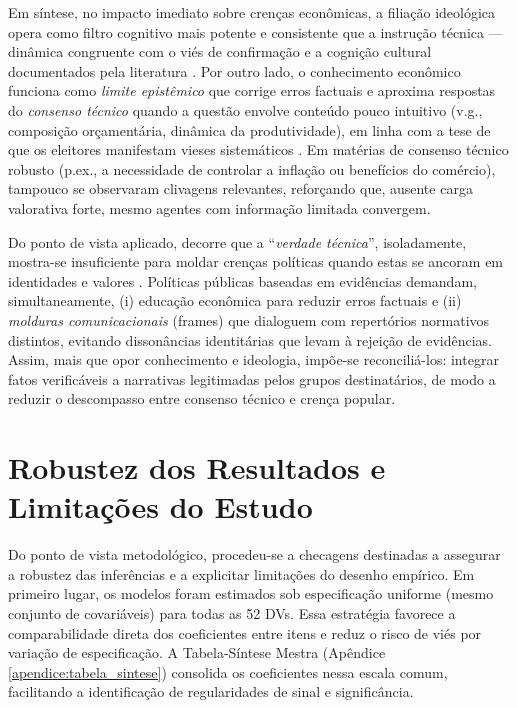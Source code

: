 Em síntese, no impacto imediato sobre crenças econômicas, a filiação ideológica opera como filtro cognitivo mais potente e consistente que a instrução técnica --- dinâmica congruente com o viés de confirmação e a cognição cultural documentados pela literatura \cite{kahneman2011thinking, kahan2012polarization}. Por outro lado, o conhecimento econômico funciona como \textit{limite epistêmico} que corrige erros factuais e aproxima respostas do \textit{consenso técnico} quando a questão envolve conteúdo pouco intuitivo (v.g., composição orçamentária, dinâmica da produtividade), em linha com a tese de que os eleitores manifestam vieses sistemáticos \cite{The_Myth_of_the_Rational_Voter}. Em matérias de consenso técnico robusto (p.ex., a necessidade de controlar a inflação ou benefícios do comércio), tampouco se observaram clivagens relevantes, reforçando que, ausente carga valorativa forte, mesmo agentes com informação limitada convergem.

Do ponto de vista aplicado, decorre que a ``\textit{verdade técnica}'', isoladamente, mostra-se insuficiente para moldar crenças políticas quando estas se ancoram em identidades e valores \cite{westen2007political}. Políticas públicas baseadas em evidências demandam, simultaneamente, (i) educação econômica para reduzir erros factuais e (ii) \textit{molduras comunicacionais} (frames) que dialoguem com repertórios normativos distintos, evitando dissonâncias identitárias que levam à rejeição de evidências. Assim, mais que opor conhecimento e ideologia, impõe-se reconciliá-los: integrar fatos verificáveis a narrativas legitimadas pelos grupos destinatários, de modo a reduzir o descompasso entre consenso técnico e crença popular.

\section{Robustez dos Resultados e Limitações do Estudo}
\label{sec:limitacao_robustez}
Do ponto de vista metodológico, procedeu-se a checagens destinadas a assegurar a robustez das inferências e a explicitar limitações do desenho empírico. Em primeiro lugar, os modelos foram estimados sob especificação uniforme (mesmo conjunto de covariáveis) para todas as 52 DVs. Essa estratégia favorece a comparabilidade direta dos coeficientes entre itens e reduz o risco de viés por variação de especificação. A Tabela-Síntese Mestra (Apêndice \autoref{apendice:tabela_sintese}) consolida os coeficientes nessa escala comum, facilitando a identificação de regularidades de sinal e significância.

